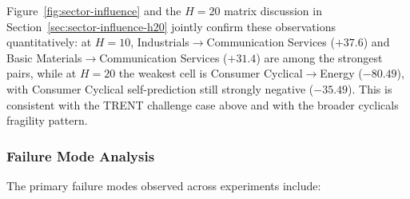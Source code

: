 \documentclass[12pt,a4paper,titlepage]{article}
\begin{document}
Figure~\ref{fig:sector-influence} and the \(H=20\) matrix discussion in Section~\ref{sec:sector-influence-h20} jointly confirm these observations quantitatively: at \(H=10\), Industrials\(\rightarrow\)Communication Services (\(+37.6\)) and Basic Materials\(\rightarrow\)Communication Services (\(+31.4\)) are among the strongest pairs, while at \(H=20\) the weakest cell is Consumer Cyclical\(\rightarrow\)Energy (\(-80.49\)), with Consumer Cyclical self-prediction still strongly negative (\(-35.49\)). This is consistent with the TRENT challenge case above and with the broader cyclicals fragility pattern.

\subsubsection{Failure Mode Analysis}

The primary failure modes observed across experiments include:
\end{document}
